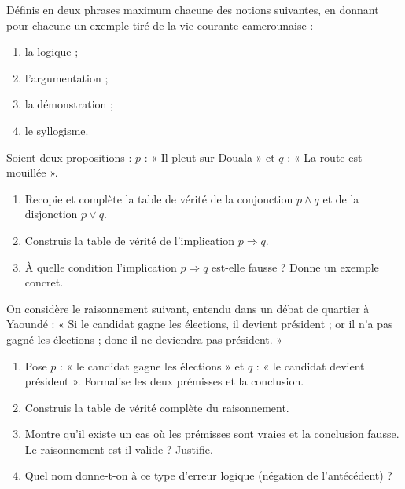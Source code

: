 \documentclass[11pt]{article}
\newcommand{\cle}[1]{{\popxbold\color{popdark}#1}}
\newcounter{popsec}
\newcounter{popsub}
\newcommand{\courssub}[1]{%
  \stepcounter{popsub}%
  \par\vspace{9pt}\noindent{\popxbold\fontsize{11.5}{13}\selectfont\color{popink}{\color{poporange}\thepopsec.\thepopsub}\hspace{6pt}#1}\par\nopagebreak\vspace{4pt}
}
\begin{document}
\begin{exercice}[Définitions]
Définis en deux phrases maximum chacune des notions suivantes, en donnant pour chacune un exemple tiré de la vie courante camerounaise :
\begin{enumerate}
\item la \cle{logique} ;
\item l'\cle{argumentation} ;
\item la \cle{démonstration} ;
\item le \cle{syllogisme}.
\end{enumerate}
\end{exercice}

\begin{exercice}
Soient deux propositions : $p$ : « Il pleut sur Douala » et $q$ : « La route est mouillée ».
\begin{enumerate}
\item Recopie et complète la table de vérité de la conjonction $p \wedge q$ et de la disjonction $p \vee q$.
\item Construis la table de vérité de l'implication $p \Rightarrow q$.
\item À quelle condition l'implication $p \Rightarrow q$ est-elle fausse ? Donne un exemple concret.
\end{enumerate}
\end{exercice}

\courssub{Je m'entraîne}

\begin{exercice}
On considère le raisonnement suivant, entendu dans un débat de quartier à Yaoundé : « Si le candidat gagne les élections, il devient président ; or il n'a pas gagné les élections ; donc il ne deviendra pas président. »
\begin{enumerate}
\item Pose $p$ : « le candidat gagne les élections » et $q$ : « le candidat devient président ». Formalise les deux prémisses et la conclusion.
\item Construis la table de vérité complète du raisonnement.
\item Montre qu'il existe un cas où les prémisses sont vraies et la conclusion fausse. Le raisonnement est-il valide ? Justifie.
\item Quel nom donne-t-on à ce type d'erreur logique (négation de l'antécédent) ?
\end{enumerate}
\end{exercice}
\end{document}
